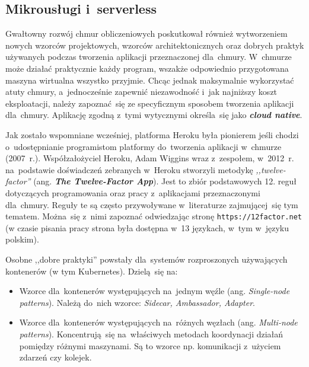 \documentclass[12pt,a4paper,twoside,titlepage,openright]{book}
\begin{document}
\subsection{Mikrousługi i~serverless} \label{section:mikroserwisy}

Gwałtowny rozwój chmur obliczeniowych poskutkował również wytworzeniem nowych wzorców projektowych, wzorców architektonicznych oraz dobrych praktyk używanych podczas tworzenia aplikacji przeznaczonej dla~chmury. W~chmurze może działać praktycznie każdy program, wszakże odpowiednio przygotowana maszyna wirtualna wszystko przyjmie. Chcąc jednak maksymalnie wykorzystać atuty chmury, a~jednocześnie zapewnić niezawodność i~jak najniższy koszt eksploatacji, należy zapoznać~się ze specyficznym sposobem tworzenia aplikacji dla~chmury. Aplikację zgodną z~tymi wytycznymi określa~się jako \textbf{\textit{cloud native}}.

Jak zostało wspomniane wcześniej, platforma Heroku była pionierem jeśli chodzi o~udostępnianie programistom platformy do~tworzenia aplikacji w~chmurze (2007~r.). Współzałożyciel Heroku, Adam Wiggins wraz z~zespołem, w~2012~r. na~podstawie doświadczeń zebranych w~Heroku stworzyli metodykę \textit{,,twelve-factor''} (ang. \textbf{\textit{The Twelve-Factor App}}). Jest to zbiór podstawowych 12. reguł dotyczących programowania oraz pracy z~aplikacjami przeznaczonymi dla~chmury. Reguły te są często przywoływane w~literaturze zajmującej~się tym tematem.\cite{cloudFoundry, microservicesPacktNetCore} Można~się z~nimi zapoznać odwiedzając stronę \texttt{https://12factor.net} (w czasie pisania pracy strona była dostępna w~13 językach, w~tym w~języku polskim).

Osobne ,,dobre praktyki'' powstały dla~systemów rozproszonych używających kontenerów (w tym Kubernetes). Dzielą~się na:
\begin{itemize}
\item Wzorce dla~kontenerów występujących na~jednym węźle (ang. \textit{Single-node patterns}). Należą do~nich wzorce: \textit{Sidecar, Ambassador, Adapter}.
\item Wzorce dla~kontenerów występujących na~różnych węzłach (ang. \textit{Multi-node patterns}). Koncentrują~się na~właściwych metodach koordynacji działań pomiędzy różnymi maszynami. Są to wzorce np. komunikacji z~użyciem zdarzeń czy kolejek.  \cite{kubernetesPacktMastering, distributedSystems}
\end{itemize}
\end{document}
